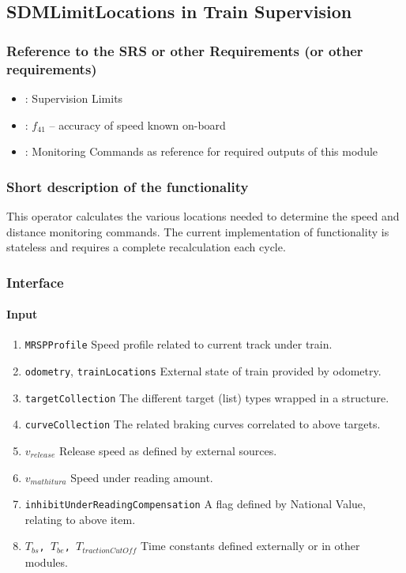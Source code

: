 \subsection{SDMLimitLocations in Train Supervision}
\subsubsection{Reference to the SRS or other Requirements (or other requirements)}
\begin{itemize}
	\item \cite[Chapt.~3.13.9]{subset-026}: Supervision Limits 
	\item \cite[Chapt.~5.3.1.2]{subset-041}: $f_{41}$ -- accuracy of speed known on-board
	\item \cite[Chapt.~3.13.10]{subset-026}: Monitoring Commands as reference for required outputs of this module
\end{itemize}

\subsubsection{Short description of the functionality}
This operator calculates the various locations needed to determine the speed and distance monitoring commands. The current implementation of functionality is stateless and requires a complete recalculation each cycle.

\subsubsection{Interface}
\paragraph{Input}
\begin{enumerate}
  \item \texttt{MRSPProfile} Speed profile related to current track under train.
  \item \texttt{odometry}, \texttt{trainLocations} External state of train provided by odometry.
  \item \texttt{targetCollection} The different target (list) types wrapped in a structure.
  \item \texttt{curveCollection} The related braking curves correlated to above targets.
  \item \texttt{$v_{\mathit{release}}$} Release speed as defined by external sources.
  \item \texttt{$v_{mathit{ura}}$} Speed under reading amount.
  \item \texttt{inhibitUnderReadingCompensation} A flag defined by National Value, relating to above item.
  \item \texttt{$T_{bs}$, $T_{be}$, $T_{\mathit{tractionCutOff}}$} Time constants defined externally or in other modules.
\end{enumerate}
